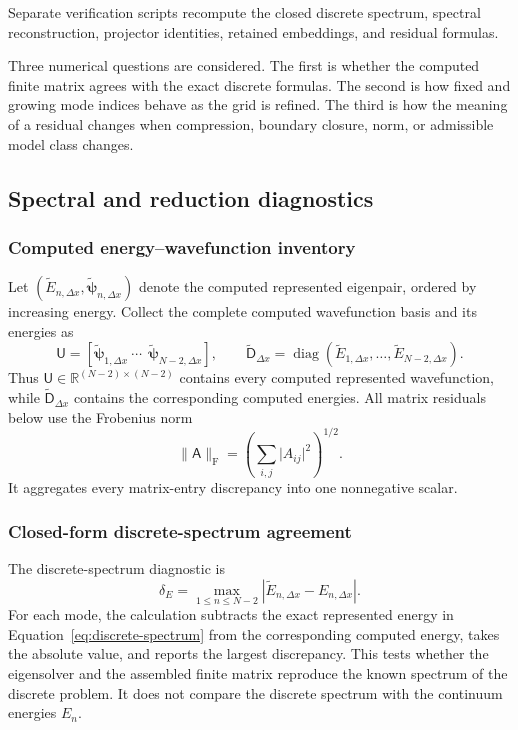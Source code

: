 \documentclass[11pt]{article}
\newcommand{\fro}{\mathrm{F}}
\newcommand{\RR}{\mathbb{R}}
\newcommand{\mat}[1]{\mathsf{#1}}
\newcommand{\vect}[1]{\boldsymbol{#1}}
\begin{document}
Separate verification scripts recompute the closed discrete spectrum, spectral
reconstruction, projector identities, retained embeddings, and residual formulas.

Three numerical questions are considered. The first is whether the computed finite
matrix agrees with the exact discrete formulas. The second is how fixed and growing
mode indices behave as the grid is refined. The third is how the meaning of a
residual changes when compression, boundary closure, norm, or admissible model class
changes.

\subsection{Spectral and reduction diagnostics}

\subsubsection{Computed energy--wavefunction inventory}

Let $(\widetilde E_{n,\Delta x},
\widetilde{\vect{\psi}}_{n,\Delta x})$ denote the computed represented eigenpair,
ordered by increasing energy. Collect the complete computed wavefunction basis and
its energies as
\begin{equation}
 \mat{U}=[\widetilde{\vect{\psi}}_{1,\Delta x}\ \cdots\
 \ \widetilde{\vect{\psi}}_{N-2,\Delta x}],
 \qquad
 \widetilde{\mat{D}}_{\Delta x}
 =\operatorname{diag}(\widetilde E_{1,\Delta x},\ldots,
 \widetilde E_{N-2,\Delta x}).
 \label{eq:computed-eigenpair-inventory}
\end{equation}
Thus $\mat{U}\in\RR^{(N-2)\times(N-2)}$ contains every computed represented
wavefunction, while $\widetilde{\mat{D}}_{\Delta x}$ contains the corresponding
computed energies.
All matrix residuals below use the Frobenius norm
\begin{equation}
 \lVert\mat{A}\rVert_{\fro}
 =\left(\sum_{i,j}\lvert A_{ij}\rvert^2\right)^{1/2}.
 \label{eq:frobenius-norm}
\end{equation}
It aggregates every matrix-entry discrepancy into one nonnegative scalar.

\subsubsection{Closed-form discrete-spectrum agreement}

The discrete-spectrum diagnostic is
\begin{equation}
 \delta_E
 =\max_{1\leq n\leq N-2}
 \left\lvert\widetilde E_{n,\Delta x}
 -E_{n,\Delta x}\right\rvert.
 \label{eq:discrete-spectrum-diagnostic}
\end{equation}
For each mode, the calculation subtracts the exact represented energy in
Equation~\eqref{eq:discrete-spectrum} from the corresponding computed energy, takes
the absolute value, and reports the largest discrepancy. This tests whether the
eigensolver and the assembled finite matrix reproduce the known spectrum of the
discrete problem. It does not compare the discrete spectrum with the continuum
energies $E_n$.
\end{document}
